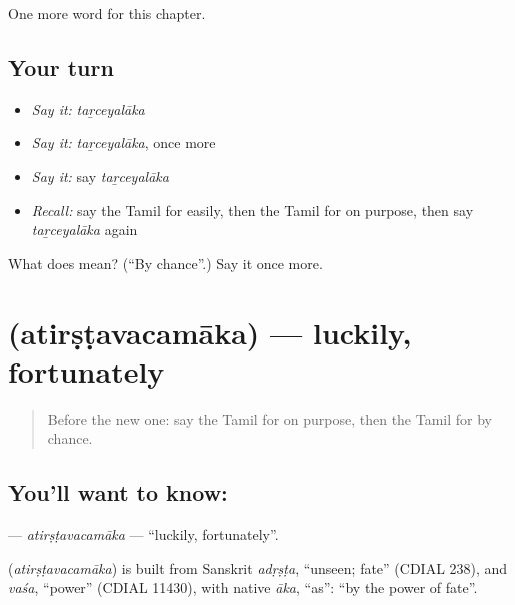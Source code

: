 \begin{grammarlens}[title={What you've built}]
One more word for this chapter.
\end{grammarlens}

\subsection*{Your turn}
\begin{itemize}
\raggedright
  \item \emph{Say it:} \emph{taṟceyalāka}
  \item \emph{Say it:} \emph{taṟceyalāka}, once more
  \item \emph{Say it:} say \emph{taṟceyalāka}
  \item \emph{Recall:} say the Tamil for easily, then the Tamil for on purpose, then say \emph{taṟceyalāka} again
\end{itemize}

\begin{tcolorbox}[breakable,colback=teal!4,colframe=teal!35!black,title={Before you move on}]
What does  mean? (\textquotedblleft{}By chance\textquotedblright{}.) Say it once more.
\end{tcolorbox}
\section[\texorpdfstring{\ta{அதிர்ஷ்டவசமாக} (atirṣṭavacamāka)}{அதிர்ஷ்டவசமாக (atirṣṭavacamāka)}]{ (atirṣṭavacamāka) — luckily, fortunately}

\label{lesson:TA-C266-atirstavacamaka}



\begin{quote}
Before the new one: say the Tamil for on purpose, then the Tamil for by chance.
\end{quote}

\subsection*{You'll want to know: }
\textbf{} — \emph{atirṣṭavacamāka} — \textquotedblleft{}luckily, fortunately\textquotedblright{}.

\begin{cousinweb}
\textbf{} (\emph{atirṣṭavacamāka}) is built from Sanskrit \emph{adṛṣṭa}, \textquotedblleft{}unseen; fate\textquotedblright{} (CDIAL 238), and \emph{vaśa}, \textquotedblleft{}power\textquotedblright{} (CDIAL 11430), with native \emph{āka}, \textquotedblleft{}as\textquotedblright{}: \textquotedblleft{}by the power of fate\textquotedblright{}.
\end{cousinweb}

